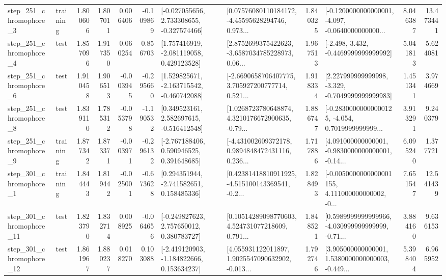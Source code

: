 \begin{tabular}{llrrrrllrlrr}
   step\_251\_chromophore\_3 &  training &      1.800606 &    1.807011 &      0.006406 & -0.109869 &   [-0.027055656, 2.733308655, -0.327574466] &  [0.07576080110184172, -4.45595628294746, 0.973... &       1.840325 &  [-0.1200000000000001, -4.097, -0.0640000000000... &            8.046387 &         13.473441 \\
   step\_251\_chromophore\_4 &      test &      1.857096 &    1.917350 &      0.060254 &  0.856703 &    [1.757416919, -2.081119058, 0.429123528] &  [2.8752699375422623, -3.6587034785228973, 0.06... &       1.967513 &               [-2.498, 3.432, -0.4469999999999992] &            5.041813 &          5.624081 \\
   step\_251\_chromophore\_6 &      test &      1.910458 &    1.906513 &     -0.003945 & -0.295660 &   [1.529825671, -2.163715542, -0.460742088] &  [-2.6690658706407775, 3.705927200777714, 0.521... &       1.918334 &   [2.227999999999998, -3.329, -0.7049999999999983] &            1.451341 &          3.974669 \\
   step\_251\_chromophore\_8 &      test &      1.839110 &    1.785312 &     -0.053798 & -1.190532 &    [0.349523161, 2.582697615, -0.516412548] &  [1.0268723780648874, 4.3210176672900635, -0.79... &       1.886747 &  [-0.28300000000000125, -4.054, 0.7019999999999... &            3.913291 &          9.240379 \\
   step\_251\_chromophore\_9 &  training &      1.877342 &    1.873371 &     -0.003971 & -0.296132 &    [-2.767188406, 0.590946525, 0.391648685] &  [-4.431002609372178, 0.9894848472431116, 0.236... &       1.717886 &  [4.091000000000001, -0.9830000000000001, -0.14... &            6.095240 &          1.377721 \\
   step\_301\_chromophore\_1 &  training &      1.844443 &    1.819442 &     -0.025001 & -0.673628 &    [0.294351944, -2.741582651, 0.158485336] &  [0.42381418810911925, -4.515100143369541, -0.2... &       1.828493 &  [-0.0050000000000001155, 4.111000000000002, -0... &            7.651547 &         12.541439 \\
  step\_301\_chromophore\_11 &      test &      1.823790 &    1.832714 &      0.008925 & -0.064656 &    [-0.249827623, 2.757650012, 0.380783727] &  [0.10514289098770603, 4.524731077218609, 0.791... &       1.848521 &  [0.5989999999999966, -4.030999999999999, -0.71... &            3.884160 &          9.636153 \\
  step\_301\_chromophore\_12 &      test &      1.861967 &    1.880237 &      0.018270 &  0.103088 &   [-2.419120903, -1.184822666, 0.153634237] &  [4.055931122011897, 1.9025547090632902, -0.013... &       1.792746 &  [3.905000000000001, 1.5380000000000003, -0.449... &            5.398404 &          6.965952 \\

\end{tabular}
